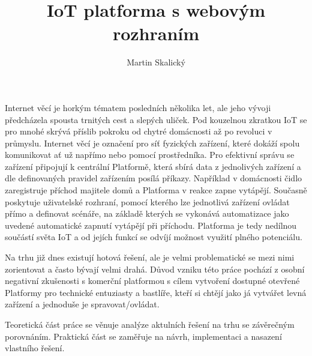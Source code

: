 \documentclass[thesis=B,czech]{FITthesis}[2019/12/23]
\title{IoT platforma s webovým rozhraním}
\author{Martin Skalický} %
\begin{document}

\begin{introduction}

    Internet věcí je horkým tématem posledních několika let, ale jeho vývoji předcházela spousta trnitých cest a slepých uliček. Pod kouzelnou zkratkou IoT se pro mnohé skrývá příslib pokroku od chytré domácnosti až po revoluci v průmyslu. Internet věcí je označení pro síť fyzických zařízení, které dokáží spolu komunikovat ať už napřímo nebo pomocí prostředníka. Pro efektivní správu se zařízení připojují k centrální Platformě, která sbírá data z jednolivých zařízení a dle definovaných pravidel zařízením posílá příkazy. Například v domácnosti čidlo zaregistruje příchod majitele domů a Platforma v reakce zapne vytápějí. Současně poskytuje uživatelské rozhraní, pomocí kterého lze jednotlivá zařízení ovládat přímo a definovat scénáře, na základě kterých se vykonává automatizace jako uvedené automatické zapnutí vytápějí při příchodu. Platforma je tedy nedílnou součástí světa IoT a od jejích funkcí se odvíjí možnost využití plného potenciálu.

    Na trhu již dnes existují hotová řešení, ale je velmi problematické se mezi nimi zorientovat a často bývají velmi drahá. Důvod vzniku této práce pochází z osobní negativní zkušenosti s komerční platformou s cílem vytvoření dostupné otevřené Platformy pro technické entuziasty a bastlíře, kteří si chtějí jako já vytvářet levná zařízení a jednoduše je spravovat/ovládat.

    Teoretická část práce se věnuje analýze aktulních řešení na trhu se závěrečným porovnáním. Praktická část se zaměřuje na návrh, implementaci a nasazení vlastního řešení.




\end{introduction}
\end{document}
